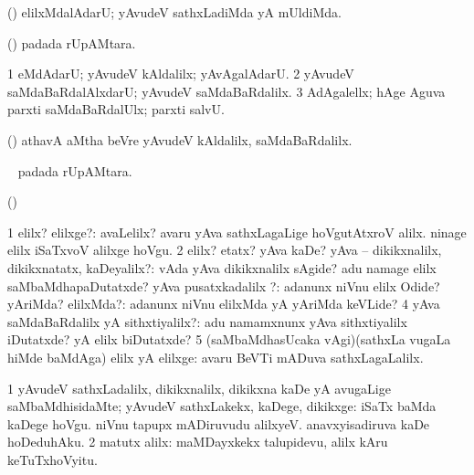 {{{{{{\bentry
{} 
\expl{}
\bmng
(\aupa) elilxMdalAdarU; yAvudeV sathxLadiMda yA mUldiMda. 
\emng
\eentry

\bentry
{} 
\expl{}
\bmng
(\kAparx) padada rUpAMtara. 
\emng
\eentry

\bentry
{} 
\expl{}
\bmng
\bnum
\num{1} eMdAdarU; yAvudeV kAldalilx; yAvAgalAdarU. 
\num{2} yAvudeV saMdaBaRdalAlxdarU; yAvudeV saMdaBaRdalilx. 
\num{3} AdAgalellx; hAge Aguva parxti saMdaBaRdalUlx; parxti salvU. 
\enum
\emng

\noindent 
\gl{\pagu}
\expl{}
\bmng
{} (\AmA) athavA aMtha beVre yAvudeV kAldalilx, saMdaBaRdalilx. 
\emng
\eentry

\bentry
{} 
\expl{}
\bmng
\kirxvi\  padada rUpAMtara. 
\emng
\eentry

\bentry
{} 
\expl{}
\bmng
 \kirxvi (\aupa) 
\emng
\eentry

\bentry
{} 
\expl{}
\bmng
\bnum
\num{1} elilx? elilxge?:  avaLelilx?  avaru yAva sathxLagaLige hoVgutAtxroV alilx.  ninage elilx iSaTxvoV alilxge hoVgu. 
\num{2} elilx? etatx? yAva kaDe? yAva -- dikikxnalilx, dikikxnatatx, kaDeyalilx?:  vAda yAva dikikxnalilx sAgide?  adu namage elilx saMbaMdhapaDutatxde? 
\banum
{} yAva pusatxkadalilx \mo?:  adanunx niVnu elilx Odide? 
 yAriMda? elilxMda?:  adanunx niVnu elilxMda yA yAriMda keVLide? 
\eanum
\numie
\num{4} yAva saMdaBaRdalilx yA sithxtiyalilx?:  adu namamxnunx yAva sithxtiyalilx iDutatxde? yA elilx biDutatxde? 
\num{5} (saMbaMdhasUcaka \kirxvi vAgi)(sathxLa \mo vugaLa hiMde baMdAga) elilx yA elilxge:  avaru BeVTi mADuva sathxLagaLalilx. 
\enum
\emng
\eentry

\bentry
{} 
\gl{\saMavayx}
\expl{}
\bmng
\bnum
\num{1} yAvudeV sathxLadalilx, dikikxnalilx, dikikxna kaDe yA avugaLige saMbaMdhisidaMte; yAvudeV sathxLakekx, kaDege, dikikxge:  iSaTx baMda kaDege hoVgu.  niVnu tapupx mADiruvudu alilxyeV.  anavxyisadiruva kaDe hoDeduhAku. 
\num{2} matutx alilx:  maMDayxkekx talupidevu, alilx kAru keTuTxhoVyitu. 
\enum
\emng
\eentry

}}}}}}
